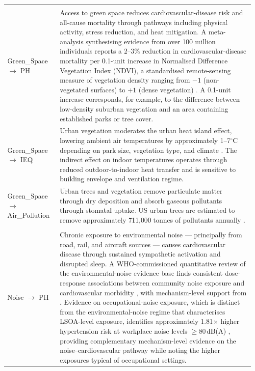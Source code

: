 \begin{longtable}{@{}p{3.8cm}p{11.2cm}@{}}
\addlinespace
\multicolumn{2}{@{}l}{\textit{Green\_Space outgoing edges}}\\
\addlinespace
Green\_Space $\to$ PH & Access to green space reduces cardiovascular-disease risk and all-cause mortality through pathways including physical activity, stress reduction, and heat mitigation. A meta-analysis synthesising evidence from over 100 million individuals reports a 2--3\% reduction in cardiovascular-disease mortality per 0.1-unit increase in Normalised Difference Vegetation Index (NDVI), a standardised remote-sensing measure of vegetation density ranging from $-1$ (non-vegetated surfaces) to $+1$ (dense vegetation) \citep{liu_green_2022, rojas-rueda_green_2019, kruize_urban_2019}. A 0.1-unit increase corresponds, for example, to the difference between low-density suburban vegetation and an area containing established parks or tree cover. \\
\addlinespace
Green\_Space $\to$ IEQ & Urban vegetation moderates the urban heat island effect, lowering ambient air temperatures by approximately 1--7$^\circ$C depending on park size, vegetation type, and climate \citep{bowler_urban_2010, aram_urban_2019, iungman_cooling_2023}. The indirect effect on indoor temperatures operates through reduced outdoor-to-indoor heat transfer and is sensitive to building envelope and ventilation regime. \\
\addlinespace
Green\_Space $\to$ Air\_Pollution & Urban trees and vegetation remove particulate matter through dry deposition and absorb gaseous pollutants through stomatal uptake. US urban trees are estimated to remove approximately 711{,}000 tonnes of pollutants annually \citep{nowak_modeled_2013, maher_impact_2013}. \\
\addlinespace
\multicolumn{2}{@{}l}{\textit{Noise outgoing edges}}\\
\addlinespace
Noise $\to$ PH & Chronic exposure to environmental noise --- principally from road, rail, and aircraft sources --- causes cardiovascular disease through sustained sympathetic activation and disrupted sleep. A WHO-commissioned quantitative review of the environmental-noise evidence base finds consistent dose-response associations between community noise exposure and cardiovascular morbidity \citep{van_kempen_quantitative_2012}, with mechanism-level support from \citet{munzel_transportation_2021}. Evidence on occupational-noise exposure, which is distinct from the environmental-noise regime that characterises LSOA-level exposure, identifies approximately 1.81$\times$ higher hypertension risk at workplace noise levels $\geq 80$\,dB(A) \citep{bolm-audorff_occupational_2020}, providing complementary mechanism-level evidence on the noise--cardiovascular pathway while noting the higher exposures typical of occupational settings. \\

\end{longtable}
